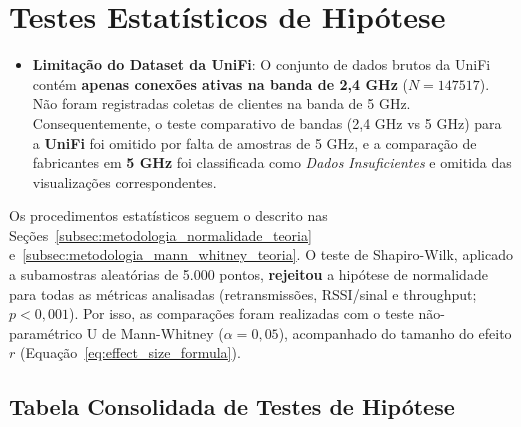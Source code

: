 \section{Testes Estatísticos de Hipótese}
\label{sec:testes_hipotese}

\begin{itemize}
  \item \textbf{Limitação do Dataset da UniFi}:
    O conjunto de dados brutos da UniFi contém \textbf{apenas conexões ativas na banda de 2,4 GHz} ($N = 147517$). Não foram registradas coletas de clientes na banda de 5 GHz. Consequentemente, o teste comparativo de bandas (2,4 GHz vs 5 GHz) para a \textbf{UniFi} foi omitido por falta de amostras de 5 GHz, e a comparação de fabricantes em \textbf{5 GHz} foi classificada como \textit{Dados Insuficientes} e omitida das visualizações correspondentes.


\end{itemize}
Os procedimentos estatísticos seguem o descrito nas Seções~\ref{subsec:metodologia_normalidade_teoria} e~\ref{subsec:metodologia_mann_whitney_teoria}. O teste de Shapiro-Wilk, aplicado a subamostras aleatórias de 5.000 pontos, \textbf{rejeitou} a hipótese de normalidade para todas as métricas analisadas (retransmissões, RSSI/sinal e throughput; $p < 0,001$). Por isso, as comparações foram realizadas com o teste não-paramétrico U de Mann-Whitney ($\alpha = 0,05$), acompanhado do tamanho do efeito $r$ (Equação~\ref{eq:effect_size_formula}).

\subsection{Tabela Consolidada de Testes de Hipótese}


